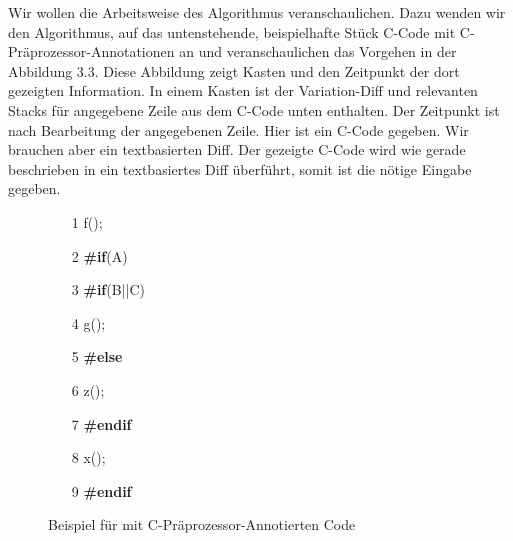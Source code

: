Wir wollen die Arbeitsweise des Algorithmus veranschaulichen. Dazu wenden wir den Algorithmus, auf das untenstehende, beispielhafte Stück C-Code mit C-Präprozessor-Annotationen an und veranschaulichen das Vorgehen in der Abbildung 3.3. Diese Abbildung zeigt Kasten und den Zeitpunkt der dort gezeigten Information. In einem Kasten ist der Variation-Diff und relevanten Stacks für angegebene Zeile aus dem C-Code unten enthalten. Der Zeitpunkt ist nach Bearbeitung der angegebenen Zeile. Hier ist ein C-Code gegeben. Wir brauchen aber ein textbasierten Diff. Der gezeigte C-Code wird wie gerade beschrieben in ein textbasiertes Diff überführt, somit ist die nötige Eingabe gegeben.
\begin{figure}[h]
	\begin{itemize}
		\item[1 ] f();
		\item[2 ] \textbf{\#if}(A)
		\item[3 ] \hspace*{0.5cm} \textbf{\#if}(B||C)
		\item[4 ] \hspace*{1cm}g();
		\item[5 ] \hspace*{0.5cm}\textbf{\#else}
		\item[6 ] \hspace*{1cm}z();
		\item[7 ] \hspace*{0.5cm}\textbf{\#endif}
		\item[8 ] \hspace*{0.5cm}x();
		\item[9 ] \textbf{\#endif}
	\end{itemize}
	\caption{Beispiel für mit C-Präprozessor-Annotierten Code}
\end{figure}

